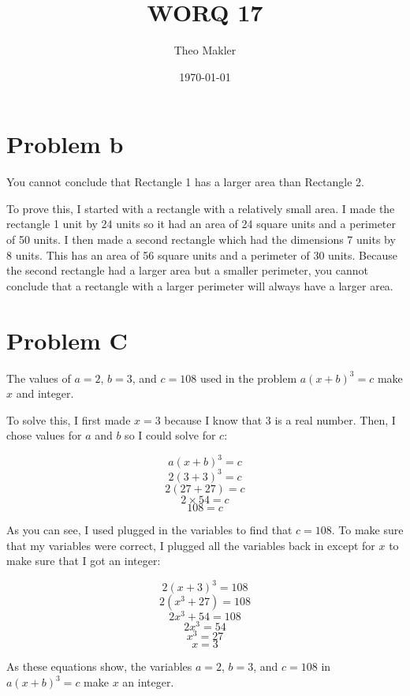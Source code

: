 \documentclass[a4paper]{article}
\title{WORQ 17}
\author{Theo Makler}
\date{\today}
\begin{document}
\maketitle

\section{Problem b}

You cannot conclude that Rectangle 1 has a larger area than Rectangle 2.

To prove this, I started with a rectangle with a relatively small area. I made the rectangle 1 unit by 24 units so it had an area of 24 square units and a perimeter of 50 units. I then made a second rectangle which had the dimensions 7 units by 8 units. This has an area of 56 square units and a perimeter of 30 units. Because the second rectangle had a larger area but a smaller perimeter, you cannot conclude that a rectangle with a larger perimeter will always have a larger area.

\section{Problem C}

The values of $a=2$, $b=3$, and $c=108$ used in the problem $a(x+b)^3=c$ make $x$ and integer.

To solve this, I first made $x=3$ because I know that 3 is a real number. Then, I chose values for $a$ and $b$ so I could solve for $c$:

$$a(x+b)^3=c$$
$$2(3+3)^3=c$$
$$2(27+27)=c$$
$$2\times54=c$$
$$108=c$$

As you can see, I used plugged in the variables to find that $c=108$. To make sure that my variables were correct, I plugged all the variables back in except for $x$ to make sure that I got an integer:

$$2(x+3)^3=108$$
$$2(x^3+27)=108$$
$$2x^3+54=108$$
$$2x^3=54$$
$$x^3=27$$
$$x=3$$

As these equations show, the variables $a=2$, $b=3$, and $c=108$ in $a(x+b)^3=c$ make $x$ an integer.
\end{document}
